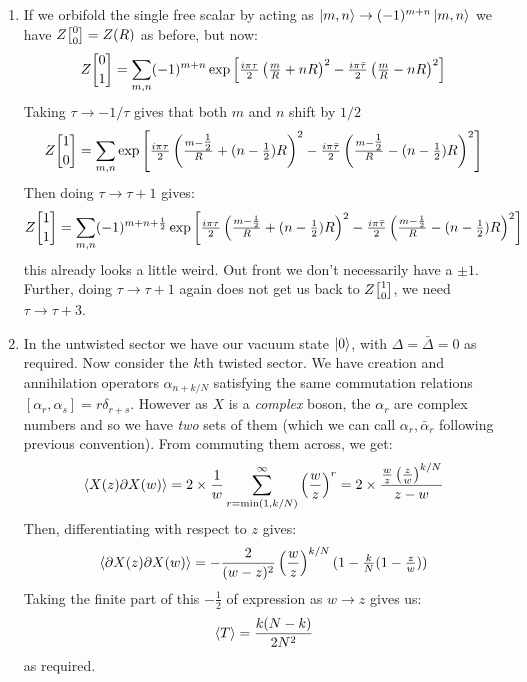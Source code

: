 \documentclass[11pt]{article}
\begin{document}
\begin{enumerate}
	\item If we orbifold the single free scalar by acting as $\ket{m, n} \to (-1)^{m+n} \ket{m, n}$ we have $Z\twist00 = Z(R)$ as before, but now:
	\[
		Z\twist01 = \sum_{m,n} (-1)^{m+n} \exp\left[\tfrac{i \pi \tau}{2} \left( \tfrac{m}{R} + n R \right)^2 - \tfrac{i \pi \bar \tau}{2} \left( \tfrac{m}{R} - n R \right)^2  \right]
	\]
	Taking $\tau \to -1/\tau$ gives that both $m$ and $n$ shift by $1/2$
	\[
		Z\twist10 = \sum_{m,n} \exp\left[\tfrac{i \pi \tau}{2} \left( \tfrac{m-\tfrac12}{R} + (n-\tfrac12) R \right)^2 - \tfrac{i \pi \bar \tau}{2} \left( \tfrac{m-\tfrac12}{R} - (n-\tfrac12) R \right)^2  \right]
	\]
	Then doing $\tau \to \tau+1$ gives:
	\[
		Z\twist11 = \sum_{m,n} (-1)^{m+n+\frac12} \exp\left[\tfrac{i \pi \tau}{2} \left( \tfrac{m-\frac12}{R} + (n-\tfrac12) R \right)^2 - \tfrac{i \pi \bar \tau}{2} \left( \tfrac{m-\frac12}{R} - (n-\tfrac12) R \right)^2 \right]
	\]
	this already looks a little weird. Out front we don't necessarily have a $\pm 1$. Further, doing $\tau \to \tau+1$ again does not get us back to $Z\twist10$, we need $\tau \to \tau+3$.
	\item In the untwisted sector we have our vacuum state $\ket0$, with $\Delta = \bar \Delta = 0$ as required. Now consider the $k$th twisted sector. We have creation and annihilation operators $\alpha_{n+k/N}$ satisfying the same commutation relations $[\alpha_r, \alpha_s] = r \delta_{r+s}$. However as $X$ is a \emph{complex} boson, the $\alpha_r$ are complex numbers and so we have \emph{two} sets of them (which we can call $\alpha_r, \bar \alpha_r$ following previous convention). From commuting them across, we get:
	\[
		\braket{X(z) \partial X(w)} = 2 \times \frac1w \sum_{r=\mathrm{min}(1,k/N)}^\infty \left( \frac{w}{z} \right)^r = 2 \times \frac{\frac{w}{z} \left(\frac{z}{w} \right)^{k/N}}{z-w}
	\]
	Then, differentiating with respect to $z$ gives:
	\[
		\braket{\partial X(z) \partial X(w)} = - \frac{2}{(w-z)^2} \left(\frac{w}{z}\right)^{k/N} (1 - \tfrac{k}{N} (1 - \tfrac{z}{w}) )
	\]
	Taking the finite part of this $-\frac12$ of expression as $w \to z$ gives us:
	\[
		\braket{T} = \frac{k (N-k)}{2 N^2}
	\]
	as required. 
	

\end{enumerate}
\end{document}
